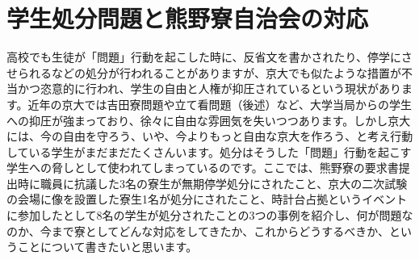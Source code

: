 
\section{学生処分問題と熊野寮自治会の対応}
\label{sec:shobun}


高校でも生徒が「問題」行動を起こした時に、反省文を書かされたり、停学にさせられるなどの処分が行われることがありますが、京大でも似たような措置が不当かつ恣意的に行われ、学生の自由と人権が抑圧されているという現状があります。近年の京大では吉田寮問題や立て看問題（後述）など、大学当局からの学生への抑圧が強まっており、徐々に自由な雰囲気を失いつつあります。しかし京大には、今の自由を守ろう、いや、今よりもっと自由な京大を作ろう、と考え行動している学生がまだまだたくさんいます。処分はそうした「問題」行動を起こす学生への脅しとして使われてしまっているのです。ここでは、熊野寮の要求書提出時に職員に抗議した3名の寮生が無期停学処分にされたこと、京大の二次試験の会場に像を設置した寮生1名が処分にされたこと、時計台占拠というイベントに参加したとして8名の学生が処分されたことの3つの事例を紹介し、何が問題なのか、今まで寮としてどんな対応をしてきたか、これからどうするべきか、ということについて書きたいと思います。

